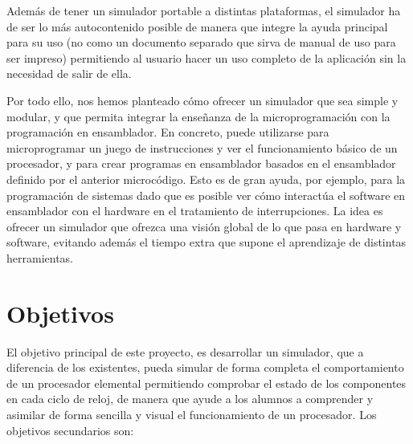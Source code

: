 Además de tener un simulador portable a distintas plataformas, el simulador ha de ser lo más autocontenido posible de manera que integre la ayuda principal para su uso (no como un documento separado que sirva de manual de uso para ser impreso) permitiendo al usuario hacer un uso completo de la aplicación sin la necesidad de salir de ella.

Por todo ello, nos hemos planteado cómo ofrecer un simulador que sea simple y modular, y que permita integrar la enseñanza de la microprogramación con la programación en ensamblador. En concreto, puede utilizarse para microprogramar un juego de instrucciones y ver el funcionamiento básico de un procesador, y para crear programas en ensamblador basados en el ensamblador definido por el anterior microcódigo. Esto es de gran ayuda, por ejemplo, para la programación de sistemas dado que es posible ver cómo interactúa el software en ensamblador con el hardware en el tratamiento de interrupciones. La idea es ofrecer un simulador que ofrezca una visión global de lo que pasa en hardware y software, evitando además el tiempo extra que supone el aprendizaje de distintas herramientas.


\section{Objetivos}
\label{sec:objectives}

El objetivo principal de este proyecto, es desarrollar un simulador, que a diferencia de los existentes, pueda simular de forma completa el comportamiento de un procesador elemental permitiendo comprobar el estado de los componentes en cada ciclo de reloj, de manera que ayude a los alumnos a comprender y asimilar de forma sencilla y visual el funcionamiento de un procesador. Los objetivos secundarios son:

